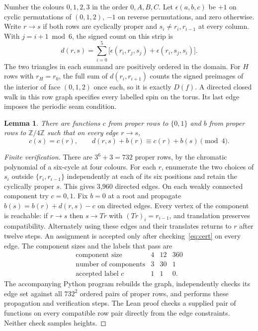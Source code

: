 \documentclass[11pt,a4paper]{article}
\newtheorem{lemma}[theorem]{Lemma}
\newcommand{\Z}{\mathbb Z}
\newcommand{\modulo}[1]{\pmod{#1}}
\begin{document}
Number the colours $0,1,2,3$ in the order $0,A,B,C$. Let $\epsilon(a,b,c)$ be $+1$ on cyclic permutations of $(0,1,2)$, $-1$ on reverse permutations, and zero otherwise. Write $r\to s$ if both rows are cyclically proper and $s_i\ne r_i,r_{i-1}$ at every column. With $j=i+1\bmod6$, the signed count on this strip is
\[
 d(r,s)=\sum_{i=0}^{5}\bigl[\epsilon(r_i,r_j,s_j)+\epsilon(r_i,s_j,s_i)\bigr].
\]
The two triangles in each summand are positively ordered in the domain. For $H$ rows with $r_H=r_0$, the full sum of $d(r_i,r_{i+1})$ counts the signed preimages of the interior of face $(0,1,2)$ once each, so it is exactly $D(f)$. A directed closed walk in this row graph specifies every labelled spin on the torus. Its last edge imposes the periodic seam condition.

\begin{lemma}\label{lem:row}
There are functions $c$ from proper rows to $\{0,1\}$ and $b$ from proper rows to $\Z/4\Z$ such that on every edge $r\to s$,
\begin{equation}\label{eq:cert}
 c(s)=c(r),\qquad d(r,s)+b(r)\equiv c(r)+b(s)\modulo4.
\end{equation}
\end{lemma}
\begin{proof}[Finite verification]
There are $3^6+3=732$ proper rows, by the chromatic polynomial of a six-cycle at four colours. For each $r$, enumerate the two choices of $s_i$ outside $\{r_i,r_{i-1}\}$ independently at each of its six positions and retain the cyclically proper $s$. This gives 3,960 directed edges. On each weakly connected component try $c=0,1$. Fix $b=0$ at a root and propagate $b(s)=b(r)+d(r,s)-c$ on directed edges. Every vertex of the component is reachable: if $r\to s$ then $s\to Tr$ with $(Tr)_i=r_{i-1}$, and translation preserves compatibility. Alternately using these edges and their translates returns to $r$ after twelve steps. An assignment is accepted only after checking~\eqref{eq:cert} on every edge. The component sizes and the labels that pass are
\[
\begin{array}{c|rrr}
 \text{component size} &4&12&360\\
 \text{number of components}&3&30&1\\
 \text{accepted label }c&1&1&0.
\end{array}
\]
The accompanying Python program rebuilds the graph, independently checks its edge set against all $732^2$ ordered pairs of proper rows, and performs these propagation and verification steps. The Lean proof checks a supplied pair of functions on every compatible row pair directly from the edge constraints. Neither check samples heights.
\end{proof}
\end{document}
